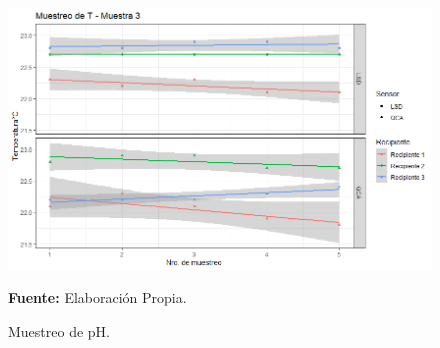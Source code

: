    \begin{figure}[H]
        \centering
        \includegraphics[width=0.7\linewidth]{Imagenes/cap4/T_M3.png}
        \caption {Muestreo de pH. }{\textbf{Fuente:}
        Elaboraci\'on Propia. }
        \label{fig:M3T}
    \end{figure}

